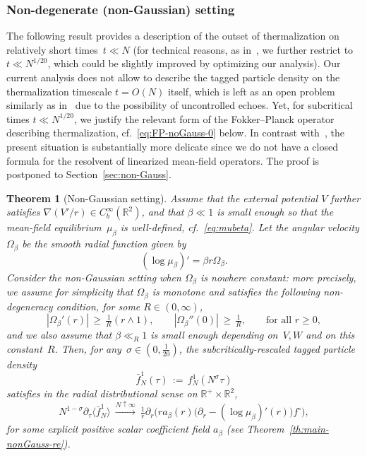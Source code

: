 \documentclass[a4paper,11pt,reqno,noindent]{amsart}
\theoremstyle{plain}
\newtheorem{theor}[lem]{Theorem}
\numberwithin{equation}{section}
\newcommand{\R}{\mathbb R}
\newcommand{\3}{|\!|\!|}
\begin{document}
\subsubsection{Non-degenerate (non-Gaussian) setting}
The following result provides a description of the outset of thermalization on relatively short times~$t\ll N$ (for technical reasons, as in~\cite{DSR-21}, we further restrict to~$t\ll N^{1/20}$, which could be slightly improved by optimizing our analysis). Our current analysis does not allow to describe the tagged particle density on the thermalization timescale $t=O(N)$ itself, which is left as an open problem similarly as in~\cite{DSR-21} due to the possibility of uncontrolled echoes.
Yet, {for subcritical times $t\ll N^{1/20}$,} we justify the relevant form of the Fokker--Planck operator describing thermalization, cf.~\eqref{eq:FP-noGauss-0} below.
In contrast with~\cite{DSR-21}, the present situation is substantially more delicate since we do not have a closed formula for the resolvent of linearized mean-field operators. 
The proof is postponed to Section~\ref{sec:non-Gauss}.

\begin{theor}[Non-Gaussian setting]\label{th:main-nonGauss}
Assume that the external potential $V$ further satisfies $\nabla(V'/r)\in C^\infty_b(\R^2)$, {and that $\beta\ll1$ is small enough so that the mean-field equilibrium~$\mu_\beta$ is well-defined, cf.~\eqref{eq:mubeta}.}
Let the angular velocity $\Omega_\beta$ be the smooth radial function given by
\begin{equation}\label{eq:angular-velo-intro}
(\log\mu_\beta)'=\beta r\Omega_\beta.
\end{equation}
Consider the non-Gaussian setting when $\Omega_\beta$ is nowhere constant:
more precisely, we assume for simplicity that $\Omega_\beta$ is monotone and satisfies the following non-degeneracy condition, for some $R\in(0,\infty)$,
\begin{equation}\label{eq:nondegenerate-0}
|\Omega_\beta'(r)|\,\ge\,\tfrac1R(r\wedge1),\qquad|\Omega_\beta''(0)|\,\ge\,\tfrac1R,
\qquad\text{for all $r\ge0$},
\end{equation}
and we also assume that $\beta\ll_R1$ is small enough depending on~$V,W$ and on this constant~$R$.
Then, for any~\mbox{$\sigma\in(0,\frac1{20})$}, the subcritically-rescaled tagged particle density
\[\bar f_N^1(\tau)\,:=\,{f_N^1(N^\sigma\tau)}\]
satisfies in the radial distributional sense on $\R^+\times\R^2$,
\begin{equation}\label{eq:FP-noGauss-0}
{N^{1-\sigma}\partial_\tau\langle\bar f_N^1\rangle}~\xrightarrow{N\uparrow\infty}~\tfrac1r\partial_r \Big(ra_\beta(r)\big(\partial_r-(\log\mu_\beta)'(r) \big)f^\circ\Big),
\end{equation}
for some explicit positive scalar coefficient field $a_\beta$ (see Theorem~\ref{th:main-nonGauss-re}).
\end{theor}
\end{document}
